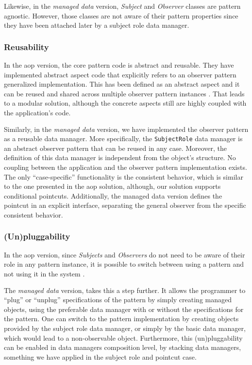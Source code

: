 Likewise, in the \textit{managed data} version, \textit{Subject} and \textit{Observer} classes are pattern agnostic.
However, those classes are not aware of their pattern properties since they have been attached later by a subject role data manager.

\subsubsection{Reusability}
In the \ac{aop} version, the core pattern code is abstract and reusable. 
They have implemented abstract aspect code that explicitly refers to an observer pattern generalized implementation.
This has been defined as an abstract aspect and it can be reused and shared across multiple observer pattern instances \cite{hannemann2005role}.
That leads to a modular solution, although the concrete aspects still are highly coupled with the application's code.

Similarly, in the \textit{managed data} version, we have implemented the observer pattern as a reusable data manager.
More specifically, the \texttt{SubjectRole} data manager is an abstract observer pattern that can be reused in any case.
Moreover, the definition of this data manager is independent from the object's structure.
No coupling between the application and the observer pattern implementation exists.
The only ``case-specific'' functionality is the consistent behavior, which is similar to the one presented in the \ac{aop} solution, although, our solution supports conditional pointcuts.
Additionally, the managed data version defines the pointcut in an explicit interface, separating the general observer from the specific consistent behavior.

\subsubsection{(Un)pluggability}
In the \ac{aop} version, since \textit{Subjects} and \textit{Observers} do not need to be aware of their role in any pattern instance, it is possible to switch between using a pattern and not using it in the system \cite{hannemann2005role}. 

The \textit{managed data} version, takes this a step further.
It allows the programmer to ``plug'' or ``unplug'' specifications of the pattern by simply creating managed objects, using the preferable data manager with or without the specifications for the pattern.
One can switch to the pattern implementation by creating objects provided by the subject role data manager, or simply by the basic data manager, which would lead to a non-observable object.
Furthermore, this (un)pluggability can be enabled in data managers composition level, by stacking data managers, something we have applied in the subject role and pointcut case.


